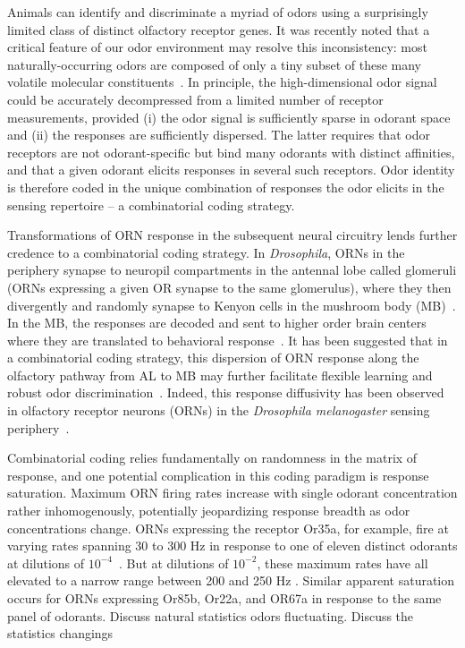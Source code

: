 
Animals can identify and discriminate a myriad of odors using a surprisingly limited class of distinct olfactory receptor genes. It was recently noted that a critical feature of our odor environment may resolve this inconsistency: most naturally-occurring odors are composed of only a tiny subset of these many volatile molecular constituents~\cite{vijay_1}. In principle, the high-dimensional odor signal could be accurately decompressed from a limited number of receptor measurements, provided (i) the odor signal is sufficiently sparse in odorant space and (ii) the responses are sufficiently dispersed. The latter requires that odor receptors are not odorant-specific but bind many odorants with distinct affinities, and that a given odorant elicits responses in several such receptors. Odor identity is therefore coded in the unique combination of responses the odor elicits in the sensing repertoire -- a combinatorial coding strategy. 

Transformations of ORN response in the subsequent neural circuitry lends further credence to a combinatorial coding strategy. In \textit{Drosophila}, ORNs in the periphery synapse to neuropil compartments in the antennal lobe called glomeruli (ORNs expressing a given OR synapse to the same glomerulus), where they then divergently and randomly synapse to Kenyon cells in the mushroom body (MB)~\cite{early_olfactory_processing, abbott_axel}. In the MB, the responses are decoded and sent to higher order brain centers where they are translated to behavioral response~\cite{olfactory_map_chiang, mushroom_body_review}. It has been suggested that in a combinatorial coding strategy, this dispersion of ORN response along the olfactory pathway from AL to MB may further facilitate flexible learning and robust odor discrimination~\cite{vijay_1}. Indeed, this response diffusivity has been observed in olfactory receptor neurons (ORNs) in the  \textit{Drosophila melanogaster} sensing periphery~\cite{hallem_carlson}. 

Combinatorial coding relies fundamentally on randomness in the matrix of response, and one potential complication in this coding paradigm is response saturation. Maximum ORN firing rates increase with single odorant concentration rather inhomogenously, potentially jeopardizing response breadth as odor concentrations change. ORNs expressing the receptor Or35a, for example, fire at varying rates spanning 30 to 300 Hz in response to one of eleven distinct odorants at dilutions of $10^{-4}$~\cite{hallem_carlson}. But at dilutions of $10^{-2}$, these maximum rates have all elevated to a narrow range between 200 and 250 Hz
. Similar apparent saturation occurs for ORNs expressing Or85b, Or22a, and OR67a in response to the same panel of odorants. {\color{blue} Discuss natural statistics odors fluctuating.} {\color{blue} Discuss the statistics changings}

